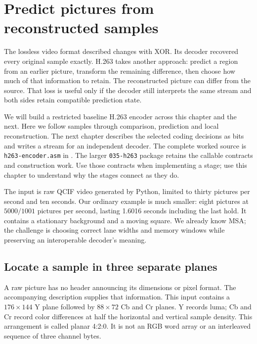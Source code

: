 \chapter{Predict pictures from reconstructed samples}
\label{revision:predicting-pictures}

The lossless video format described changes with XOR. Its decoder recovered every
original sample exactly. H.263 takes another approach: predict a region from an
earlier picture, transform the remaining difference, then choose how much of that
information to retain. The reconstructed picture can differ from the source.
That loss is useful only if the decoder still interprets the same stream and
both sides retain compatible prediction state.

We will build a restricted baseline H.263 encoder across this chapter and the
next. Here we follow samples through comparison, prediction and local
reconstruction. The next chapter describes the selected coding decisions as
bits and writes a stream for an independent decoder. The complete worked source
is \texttt{h263-encoder.asm} in . The larger
\texttt{035-h263} package retains the callable contracts and construction work.
Use those contracts when implementing a stage; use this chapter to understand
why the stages connect as they do.

The input is raw QCIF video generated by Python, limited to thirty pictures per
second and ten seconds. Our ordinary example is much smaller: eight pictures at
$5000/1001$ pictures per second, lasting 1.6016 seconds including the last hold.
It contains a stationary background and a moving square. We already know MSA;
the challenge is choosing correct lane widths and memory windows while preserving
an interoperable decoder's meaning.

\section{Locate a sample in three separate planes}

A raw picture has no header announcing its dimensions or pixel format. The
accompanying description supplies that information. This input contains a
$176\times144$ Y plane followed by $88\times72$ Cb and Cr planes. Y records
luma; Cb and Cr record color differences at half the horizontal and vertical
sample density. This arrangement is called planar 4:2:0. It is not an RGB word
array or an interleaved sequence of three channel bytes.


